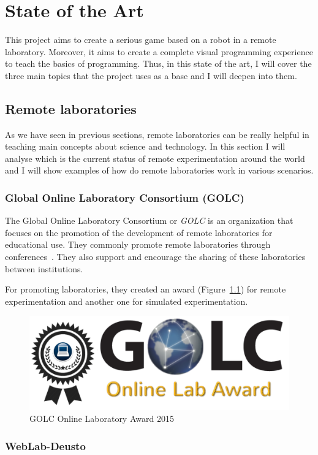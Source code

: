 \chapter{State of the Art}

This project aims to create a serious game based on a robot in a remote laboratory. Moreover, it
aims to create a complete visual programming experience to teach the basics of programming. Thus,
in this state of the art, I will cover the three main topics that the project uses as a base and I
will deepen into them.

\section{Remote laboratories}

As we have seen in previous sections, remote laboratories can be really helpful in teaching main
concepts about science and technology. In this section I will analyse which is the current status of
remote experimentation around the world and I will show examples of how do remote laboratories work
in various scenarios.

\subsection{Global Online Laboratory Consortium (GOLC)}

The Global Online Laboratory Consortium or \textit{GOLC} is an organization that focuses on
the promotion of the development of remote laboratories for educational use. They commonly promote
remote laboratories through conferences~\cite{golc1st}. They also support and encourage the sharing
of these laboratories between institutions.

For promoting laboratories, they created an award (Figure~\ref{fig:golc_award}) for remote
experimentation and another one for simulated experimentation.

\begin{figure}[h]
	\centering
	\includegraphics[width=.4\textwidth]{fig/golc_award}
	\caption{GOLC Online Laboratory Award 2015}\label{fig:golc_award}
\end{figure}

\subsection{WebLab-Deusto}

